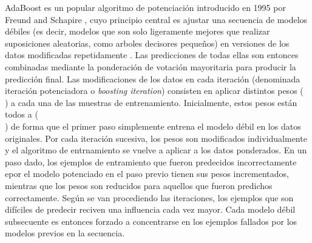 AdaBoost es un popular algoritmo de potenciación introducido en 1995 por Freund and Schapire %
, cuyo principio central es ajustar una secuencia de modelos débiles (es decir, modelos que son solo ligeramente mejores que realizar suposiciones aleatorias, como arboles decisores pequeños) en versiones de los datos modificadas repetidamente . Las predicciones de todas ellas son entonces combinadas mediante la ponderación de votación mayoritaria para producir la predicción final.
Las modificaciones de los datos en cada iteración (denominada iteración potenciadora o  \emph{boosting iteration}) consisten en aplicar distintos pesos ($$$$) a cada una de las muestras de entrenamiento.
Inicialmente, estos pesos están todos a ($$$$) de forma que el primer paso simplemente entrena el modelo débil en los datos originales.
Por cada iteración sucesiva, los pesos son modificados individualmente y el algoritmo de entrnamiento se vuelve a aplicar a los datos ponderados. En un paso dado, los ejemplos de entramiento que fueron predecidos incorrectamente epor el modelo potenciado en el paso previo tienen sus pesos incrementados, mientras que los pesos son reducidos para aquellos que fueron predichos correctamente.
Según se van procediendo las iteraciones, los ejemplos que son difíciles de predecir reciven una influencia cada vez mayor.
Cada modelo débil subsecuente es entonces forzado a concentrarse en los ejemplos fallados por los modelos previos en la secuencia. %